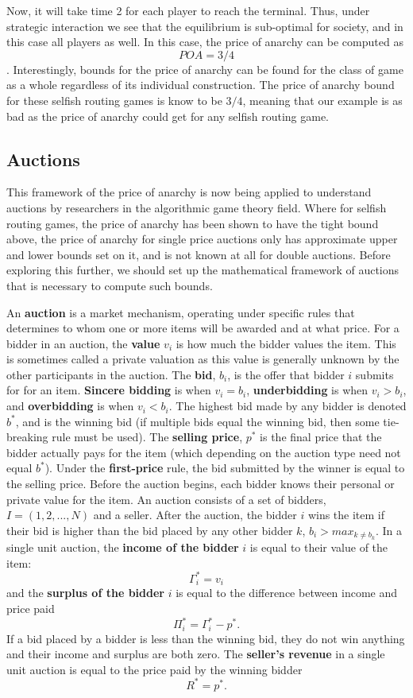 \documentclass[12pt,twoside]{reedthesis}
\begin{document}
Now, it will take time 2 for each player to reach the terminal. Thus, under strategic interaction we see that the equilibrium is sub-optimal for society, and in this case all players as well. In this case, the price of anarchy can be computed as $$POA = 3/4$$. Interestingly, bounds for the price of anarchy can be found for the class of game as a whole regardless of its individual construction. The price of anarchy bound for these selfish routing games is know to be $3/4$, meaning that our example is as bad as the price of anarchy could get for any selfish routing game.

\subsection{Auctions}
This framework of the price of anarchy is now being applied to understand auctions by researchers in the algorithmic game theory field. Where for selfish routing games, the price of anarchy has been shown to have the tight bound above, the price of anarchy for single price auctions only has approximate upper and lower bounds set on it, and is not known at all for double auctions. Before exploring this further, we should set up the mathematical framework of auctions that is necessary to compute such bounds. 

An \textbf{auction} is a market mechanism, operating under specific rules that determines to whom one or more items will be awarded and at what price. For a bidder in an auction, the \textbf{value} $v_i$ is how much the bidder values the item. This is sometimes called a private valuation as this value is generally unknown by the other participants in the auction. The \textbf{bid}, $b_i$, is the offer that bidder $i$ submits for for an item. \textbf{Sincere bidding} is when $v_i = b_i$, \textbf{underbidding} is when $v_i > b_i$, and \textbf{overbidding} is when $v_i < b_i$. The highest bid made by any bidder is denoted $b^*$, and is the winning bid (if multiple bids equal the winning bid, then some tie-breaking rule must be used). The \textbf{selling price}, $p^*$ is the final price that the bidder actually pays for the item (which depending on the auction type need not equal $b^*$). Under the \textbf{first-price} rule, the bid submitted by the winner is equal to the selling price. Before the auction begins, each bidder knows their personal or private value for the item. An auction consists of a set of bidders, $I = (1,2, ...,N)$ and a seller. After the auction, the bidder $i$ wins the item if their bid is higher than the bid placed by any other bidder $k$, $b_i > max_{k \neq b_k}$. In a single unit auction, the \textbf{income of the bidder} $i$ is equal to their value of the item: $$ \Gamma_i^* = v_i$$ and the \textbf{surplus of the bidder} $i$ is equal to the difference between income and price paid $$ \Pi_i^* = \Gamma_i^* - p^*.$$ If a bid placed by a bidder is less than the winning bid, they do not win anything and their income and surplus are both zero. The \textbf{seller's revenue} in a single unit auction is equal to the price paid by the winning bidder $$ R^* = p^*.$$ 
\end{document}
